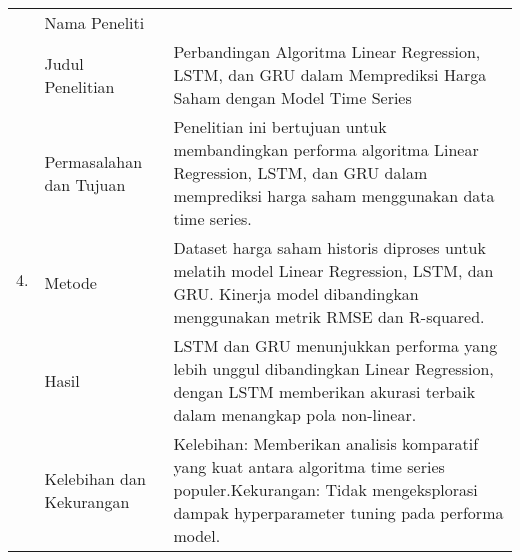 \begin{center}
\begin{longtable}{| m{1cm} | m{3cm}| p{8cm} |}
    \hline
		\multirow[t]{6}{*}{4.}             & Nama Peneliti                          & \cite{sofi2021perbandingan} \\
		\cline{2-3}
		                                   & Judul Penelitian                       & Perbandingan Algoritma Linear Regression, LSTM, dan GRU dalam Memprediksi Harga Saham dengan Model Time Series \\
		\cline{2-3}
		                                   & Permasalahan dan Tujuan                & Penelitian ini bertujuan untuk membandingkan performa algoritma Linear Regression, LSTM, dan GRU dalam memprediksi harga saham menggunakan data time series. \\
		\cline{2-3}
		                                   & Metode                                 & Dataset harga saham historis diproses untuk melatih model Linear Regression, LSTM, dan GRU. Kinerja model dibandingkan menggunakan metrik RMSE dan R-squared. \\
		\cline{2-3}
		                                   & Hasil                                  & LSTM dan GRU menunjukkan performa yang lebih unggul dibandingkan Linear Regression, dengan LSTM memberikan akurasi terbaik dalam menangkap pola non-linear. \\
		\cline{2-3}
		                                   & Kelebihan dan Kekurangan               & Kelebihan: Memberikan analisis komparatif yang kuat antara algoritma time series populer.\newline Kekurangan: Tidak mengeksplorasi dampak hyperparameter tuning pada performa model.\\


\end{longtable}
\end{center}
